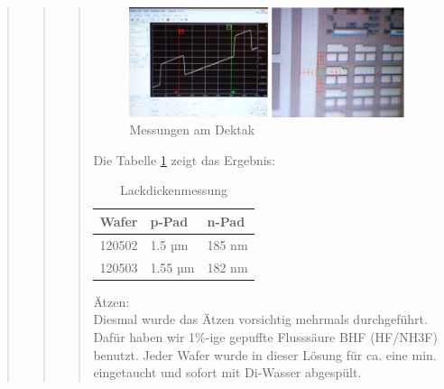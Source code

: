 \begin{quote}
\begin{quote}
\begin{quote}
			\vspace{2em}

    		\begin{figure}[H]
				\hspace{-1.5 cm}
                  \includegraphics[scale=1, trim = 0cm 0cm 0cm 0cm,clip]
                	{./HerstellungBilder/MessungenamDektak.png}
                  \caption{Messungen am Dektak}
                \label{fig:Dektak}
            \end{figure}

    		\vspace{2em}
    		
    		Die Tabelle \ref{tab:Lackdickenmess} zeigt das Ergebnis:
    		
    		\vspace{2em}

      		\begin{table}[h]
     		  \begin{addmargin}[3cm]{3cm}
     			\centering
                   \begin{tabular}{|p{3cm}|p{3cm}|p{3cm}|}
         			\hline
         			Wafer & p-Pad & n-Pad\\
         			\hline
        			120502 & 1.5 µm     & 185 nm\\
        			\hline
                    120503 & 1.55 µm 	& 182 nm\\
                    \hline

                    \end{tabular}
              \end{addmargin}
              \caption{Lackdickenmessung}
              \label{tab:Lackdickenmess}
            \end{table}

            \vspace{2em}

			Ätzen:\\

			Diesmal wurde das Ätzen vorsichtig mehrmals durchgeführt. Dafür 
			haben wir 1\%-ige gepuffte Flusssäure BHF (HF/NH3F) benutzt. Jeder 
			Wafer wurde in dieser Lösung für ca. eine min. eingetaucht und 
			sofort mit Di-Wasser abgespült.
			

\end{quote}
\end{quote}
\end{quote}

